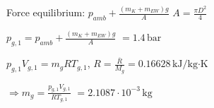 Force equilibrium:  
\( p_{amb} + \frac{(m_K + m_{EW}) g}{A} \)  
\( A = \frac{\pi D^2}{4} \)  

\( p_{g,1} = p_{amb} + \frac{(m_K + m_{EW}) g}{A} \)  
\( = 1.4 \, \text{bar} \)  

\( p_{g,1} V_{g,1} = m_g R T_{g,1} \), \( R = \frac{\overline{R}}{M_g} = 0.16628 \, \text{kJ/kg·K} \)  

\( \Rightarrow m_g = \frac{p_{g,1} V_{g,1}}{R T_{g,1}} \)  
\( = 2.1087 \cdot 10^{-3} \, \text{kg} \)